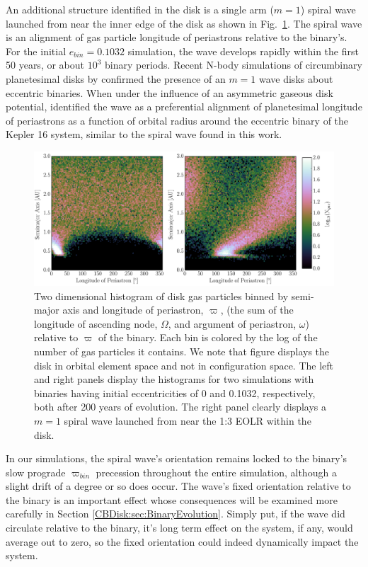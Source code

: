 An additional structure identified in the disk is a single arm ($m = 1$) spiral wave launched from near the inner edge of the disk as shown
in Fig.~\ref{fig:CBDiskDiskWave}.  The spiral wave is an alignment of gas particle longitude of periastrons relative to the binary's.  For the initial $e_{bin} = 0.1032$ simulation, the wave develops rapidly within the first 50 years, or about $10^3$ binary periods.  Recent N-body simulations of circumbinary planetesimal disks by \citet{Lines2016} confirmed the presence of an $m = 1$ wave disks about eccentric binaries.  When under the influence of an asymmetric gaseous disk potential, \citet{Lines2016} identified the wave as a preferential alignment of planetesimal longitude of periastrons as a function of orbital radius around the eccentric binary of the Kepler 16 system, similar to the spiral wave found in this work.

\begin{figure}
	\includegraphics[width=\textwidth]{f5}
    \caption{Two dimensional histogram of disk gas particles binned by semi-major axis and
longitude of periastron, $\varpi$, (the sum of the longitude of ascending node, $\Omega$, and argument of periastron, $\omega$)
relative to $\varpi$ of the binary.  Each bin is colored by the log of the number of gas particles it contains.  We note that figure displays the disk in orbital element 
space and not in configuration space.  The left and right panels display the histograms for two simulations with binaries having initial eccentricities of 0 and 
0.1032, respectively, both after 200 years of evolution.  The right panel clearly displays a $m = 1$ spiral wave launched from near the 1:3 EOLR within the disk.}
    \label{fig:CBDiskDiskWave}
\end{figure}

In our simulations, the spiral wave's orientation remains locked to
the binary's slow prograde $\varpi_{bin}$ precession throughout the
entire simulation, although a slight drift of a degree or so does
occur.  The wave's fixed orientation relative to the binary is an
important effect whose consequences will be examined more carefully in
Section \ref{CBDisk:sec:BinaryEvolution}.  Simply put, if the wave did circulate
relative to the binary, it's long term effect on the system, if any,
would average out to zero, so the fixed orientation could indeed dynamically impact the system.

